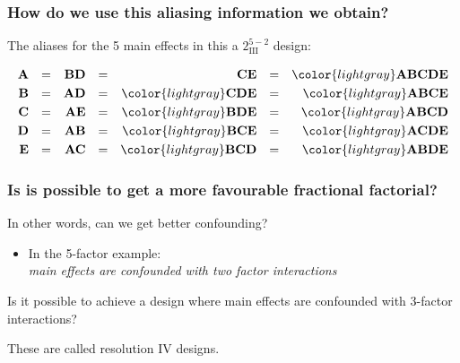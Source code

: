 \begin{frame}\frametitle{How do we use this aliasing information we obtain?}
	
	\vspace{1cm}
	The aliases for the 5 main effects in this a $2^{5-2}_{\textrm{III}}$ design:
	
	\vspace{0.5cm}
	\begin{align*}
		\textbf{A} &&=&& \textbf{BD} &&=&& \textbf{CE} &&=&&\color{lightgray} \textbf{ABCDE}\\
		\textbf{B} &&=&& \textbf{AD} &&=&& \color{lightgray} \textbf{CDE} &&=&& {\color{lightgray}\textbf{ABCE}}\\
		\textbf{C} &&=&& \textbf{AE} &&=&& \color{lightgray} \textbf{BDE} &&=&& \color{lightgray}\textbf{ABCD}\\
		\textbf{D} &&=&& \textbf{AB} &&=&& \color{lightgray}\textbf{BCE}  &&=&& \color{lightgray} \textbf{ACDE}\\
		\textbf{E} &&=&& \textbf{AC} &&=&& \color{lightgray} \textbf{BCD} &&=&& \color{lightgray} \textbf{ABDE}\\
	\end{align*}
	
\end{frame}

\begin{frame}\frametitle{Is is possible to get a more favourable fractional factorial? }
	
	\begin{exampleblock}{}
		In other words, can we get better confounding?
	\end{exampleblock}
	
	
	
	\begin{itemize}
		\item	In the 5-factor example:\\
			\qquad\qquad \emph{main effects are confounded with two factor interactions}
		
	\end{itemize}
	\vspace{1cm}
	
			Is it possible to achieve a design where main effects are confounded with 3-factor interactions?
			
	\vspace{1cm}
	
		\pause
		These are called resolution \textrm{IV} designs.
\end{frame}

